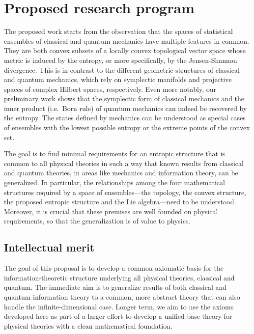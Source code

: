\section{Proposed research program}

The proposed work starts from the observation that the spaces of statistical ensembles of classical and quantum mechanics have multiple features in common. They are both convex subsets of a locally convex topological vector space whose metric is induced by the entropy, or more specifically, by the Jensen-Shannon divergence. This is in contrast to the different geometric structures of classical and quantum mechanics, which rely on symplectic manifolds and projective spaces of complex Hilbert spaces, respectively. Even more notably, our preliminary work shows that the symplectic form of classical mechanics and the inner product (i.e.~Born rule) of quantum mechanics can indeed be recovered by the entropy. The states defined by mechanics can be understood as special cases of ensembles with the lowest possible entropy or the extreme points of the convex set.

The goal is to find minimal requirements for an entropic structure that is common to all physical theories in such a way that known results from classical and quantum theories, in areas like mechanics and information theory, can be generalized. In particular, the relationships among the four mathematical structures required by a space of ensembles---the topology, the convex structure, the proposed entropic structure and the Lie algebra---need to be understood. Moreover, it is crucial that these premises are well founded on physical requirements, so that the generalization is of value to physics.



\subsection{Intellectual merit}

The goal of this proposal is to develop a common axiomatic basis for the information-theoretic structure underlying all physical theories, classical and quantum. The immediate aim is to generalize results of both classical and quantum information theory to a common, more abstract theory that can also handle the infinite-dimensional case. Longer term, we aim to use the axioms developed here as part of a larger effort to develop a unified base theory for physical theories with a clean mathematical foundation.

